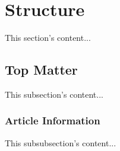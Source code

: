 \documentclass[a4paper, titlepage, 12pt]{article}
\begin{document}
\maketitle

\tableofcontents



\section{Structure}
This section's content...

\subsection{Top Matter}
This subsection's content...

\subsubsection{Article Information}
This subsubsection's content...
\end{document}
